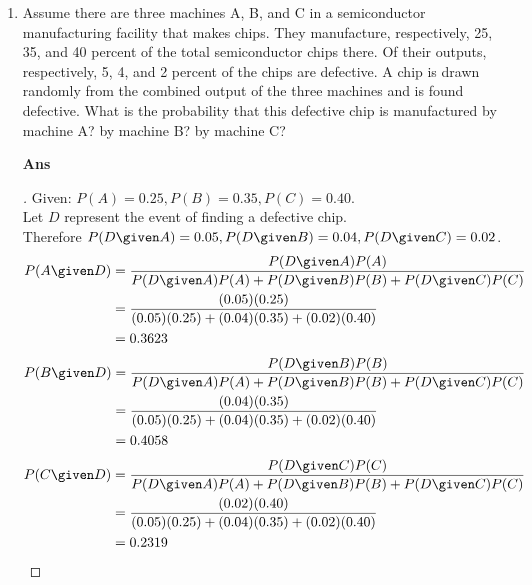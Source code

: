 \documentclass[paper=usletter, fontsize=12pt]{article}
\begin{document}
\begin{enumerate}
        \item Assume there are three machines A, B, and C in a semiconductor
        manufacturing facility that makes chips. They manufacture,
        respectively, 25, 35, and 40 percent of the total semiconductor chips
        there. Of their outputs, respectively, 5, 4, and 2 percent of the chips
        are defective. A chip is drawn randomly from the combined output of the
        three machines and is found defective. What is the probability that
        this defective chip is manufactured by machine A? by machine B? by
        machine C?
        \item[\textbf{Ans}]
        \begin{proof}[\unskip\nopunct]
            Given: $P(A) = 0.25, P(B) = 0.35, P(C) = 0.40$. \\
            Let $D$ represent the event of finding a defective chip.\\
            Therefore $P(D \given A) = 0.05, P(D \given B) = 0.04, P(D \given C) = 0.02$.
            \begin{align*}
                P(A \given D) & = \frac{P(D \given A)P(A)}{P(D \given A)P(A) +
                P(D \given B)P(B) + P(D \given C)P(C)} \\
                & = \frac{(0.05)(0.25)}{(0.05)(0.25) + (0.04)(0.35) +
                (0.02)(0.40)} \\
                & = 0.3623
            \end{align*}
            \begin{align*}
                P(B \given D) & = \frac{P(D \given B)P(B)}{P(D \given A)P(A) +
                P(D \given B)P(B) + P(D \given C)P(C)} \\
                & = \frac{(0.04)(0.35)}{(0.05)(0.25) + (0.04)(0.35) +
                (0.02)(0.40)} \\
                & = 0.4058
            \end{align*}
            \begin{align*}
                P(C \given D) & = \frac{P(D \given C)P(C)}{P(D \given A)P(A) +
                P(D \given B)P(B) + P(D \given C)P(C)} \\
                & = \frac{(0.02)(0.40)}{(0.05)(0.25) + (0.04)(0.35) +
                (0.02)(0.40)} \\
                & = 0.2319 \qedhere
            \end{align*}
        \end{proof}
        \vspace{0.2in}


\end{enumerate}
\end{document}
